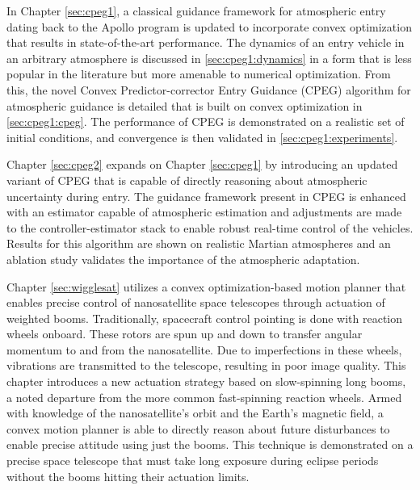 
In Chapter \ref{sec:cpeg1}, a classical guidance framework for atmospheric entry dating back to the Apollo program is updated to incorporate convex optimization that results in state-of-the-art performance. 
The dynamics of an entry vehicle in an arbitrary atmosphere is discussed in \ref{sec:cpeg1:dynamics} in a form that is less popular in the literature but more amenable to numerical optimization.
From this, the novel Convex Predictor-corrector Entry Guidance (CPEG) algorithm for atmospheric guidance is detailed that is built on convex optimization in \ref{sec:cpeg1:cpeg}.
The performance of CPEG is demonstrated on a realistic set of initial conditions, and convergence is then validated in \ref{sec:cpeg1:experiments}. 

Chapter \ref{sec:cpeg2} expands on Chapter \ref{sec:cpeg1} by introducing an updated variant of CPEG that is capable of directly reasoning about atmospheric uncertainty during entry.
The guidance framework present in CPEG is enhanced with an estimator capable of atmospheric estimation and adjustments are made to the controller-estimator stack to enable robust real-time control of the vehicles.
Results for this algorithm are shown on realistic Martian atmospheres and an ablation study validates the importance of the atmospheric adaptation. 

Chapter \ref{sec:wigglesat} utilizes a convex optimization-based motion planner that enables precise control of nanosatellite space telescopes through actuation of weighted booms.
Traditionally, spacecraft control pointing is done with reaction wheels onboard. These rotors are spun up and down to transfer angular momentum to and from the nanosatellite.
Due to imperfections in these wheels, vibrations are transmitted to the telescope, resulting in poor image quality.  
This chapter introduces a new actuation strategy based on slow-spinning long booms, a noted departure from the more common fast-spinning reaction wheels. Armed with knowledge of the nanosatellite's orbit and the Earth's magnetic field, a convex motion planner is able to directly reason about future disturbances to enable precise attitude using just the booms. 
This technique is demonstrated on a precise space telescope that must take long exposure during eclipse periods without the booms hitting their actuation limits. 

